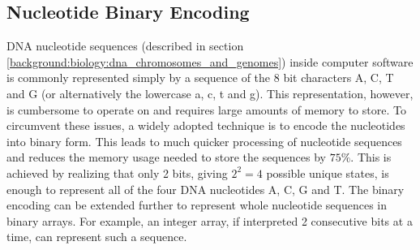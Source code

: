 \subsection{Nucleotide Binary Encoding} \label{background:nucleotide_binary_encoding}

DNA nucleotide sequences (described in section \ref{background:biology:dna_chromosomes_and_genomes}) inside computer software is commonly represented simply by a sequence of the 8 bit characters A, C, T and G (or alternatively the lowercase a, c, t and g).
This representation, however, is cumbersome to operate on and requires large amounts of memory to store.
To circumvent these issues, a widely adopted technique is to encode the nucleotides into binary form.
This leads to much quicker processing of nucleotide sequences and reduces the memory usage needed to store the sequences by $75\%$.
This is achieved by realizing that only 2 bits, giving \textit{$2^2=4$} possible unique states, is enough to represent all of the four DNA nucleotides A, C, G and T.
The binary encoding can be extended further to represent whole nucleotide sequences in binary arrays.
For example, an integer array, if interpreted 2 consecutive bits at a time, can represent such a sequence.

